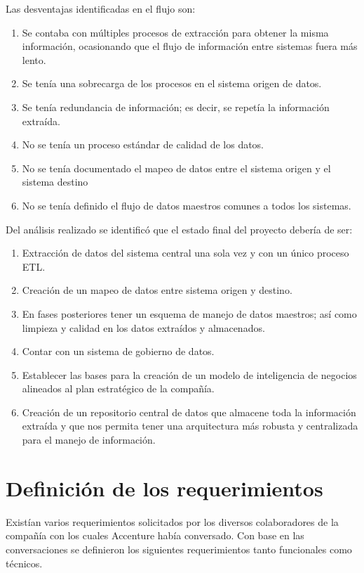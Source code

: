Las desventajas identificadas en el flujo son:

\begin{enumerate}
\item Se contaba con múltiples procesos de extracción para obtener la misma
  información, ocasionando que el flujo de información entre sistemas fuera más
  lento.
\item Se tenía una sobrecarga de los procesos en el sistema origen de datos.
\item Se tenía redundancia de información; es decir, se repetía la información
  extraída.
\item No se tenía un proceso estándar de calidad de los datos.
\item No se tenía documentado el mapeo de datos entre el sistema origen y el
  sistema destino
\item No se tenía definido el flujo de datos maestros comunes a todos los sistemas.
\end{enumerate}

Del análisis realizado se identificó que el estado final del proyecto debería de
ser:

\begin{enumerate}
\item Extracción de datos del sistema central una sola vez y con un único
  proceso ETL.
\item Creación de un mapeo de datos entre sistema origen y destino.
\item En fases posteriores tener un esquema de manejo de datos maestros; así
  como limpieza y calidad en los datos extraídos y almacenados.
\item Contar con un sistema de gobierno de datos.
\item Establecer las bases para la creación de un modelo de inteligencia de
  negocios alineados al plan estratégico de la compañía.
\item Creación de un repositorio central de datos que almacene toda la
  información extraída y que nos permita tener una arquitectura más robusta y
  centralizada para el manejo de información.
\end{enumerate}

\section{Definición de los requerimientos}

Existían varios requerimientos solicitados por los diversos colaboradores de la
compañía con los cuales Accenture había conversado. Con base en las
conversaciones se definieron los siguientes requerimientos tanto funcionales
como técnicos.

